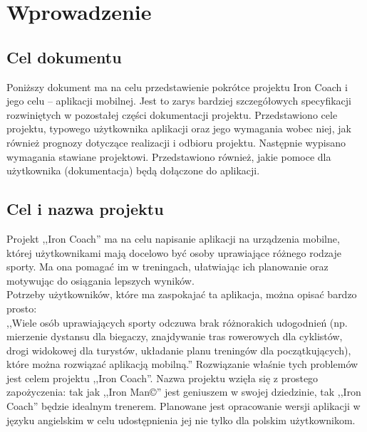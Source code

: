 

\tableofcontents
\clearpage
\section{Wprowadzenie}
\subsection{Cel dokumentu}
\noindent Poniższy dokument ma na celu przedstawienie pokrótce projektu Iron Coach i jego celu -- aplikacji mobilnej. Jest to zarys bardziej szczegółowych specyfikacji rozwiniętych w pozostałej części dokumentacji projektu. Przedstawiono cele projektu, typowego użytkownika aplikacji oraz jego wymagania wobec niej, jak również prognozy dotyczące realizacji i odbioru projektu. Następnie wypisano wymagania stawiane projektowi. Przedstawiono również, jakie pomoce dla użytkownika (dokumentacja) będą dołączone do aplikacji.
\subsection{Cel i nazwa projektu}
\noindent Projekt ,,Iron Coach'' ma na celu napisanie aplikacji na urządzenia mobilne, której użytkownikami mają docelowo być osoby uprawiające różnego rodzaje sporty. Ma ona pomagać im w treningach, ułatwiając ich planowanie oraz motywując do osiągania lepszych wyników. \\
Potrzeby użytkowników, które ma zaspokajać ta aplikacja, można opisać bardzo prosto:\\ 
\indent ,,Wiele osób uprawiających sporty odczuwa brak różnorakich udogodnień (np. mierzenie dystansu dla biegaczy, znajdywanie tras rowerowych dla cyklistów, drogi widokowej dla turystów, układanie planu treningów dla początkujących), które można rozwiązać aplikacją mobilną.''\cite{Ba}
Rozwiązanie właśnie tych problemów jest celem projektu ,,Iron Coach''. 
Nazwa projektu wzięła się z prostego zapożyczenia: tak jak ,,Iron Man©'' jest geniuszem w swojej dziedzinie, tak ,,Iron Coach'' będzie idealnym trenerem. Planowane jest opracowanie wersji aplikacji w języku angielskim w celu udostępnienia jej nie tylko dla polskim użytkownikom.
